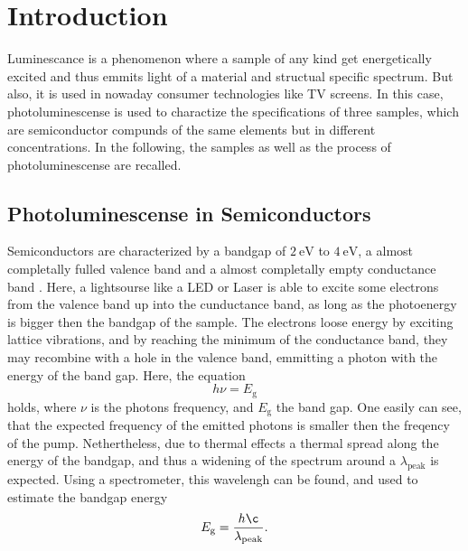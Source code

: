 \section{Introduction}
\label{sec:Introduction}

Luminescance is a phenomenon where a sample of any kind get energetically excited and thus emmits light of a material and structual specific spectrum.
But also, it is used in nowaday consumer technologies like TV screens. 
In this case, photoluminescense is used to charactize the specifications of three samples, which are semiconductor compunds of the same elements but in different concentrations.
In the following, the samples as well as the process of photoluminescense are recalled.

\subsection{Photoluminescense in Semiconductors}
\label{sec:PLS}

Semiconductors are characterized by a bandgap of $\SI{2}{\eV}$ to $\SI{4}{\eV}$, a almost completally fulled valence band and a almost completally empty conductance band \cite[391]{festkorperphysik}.
Here, a lightsourse like a LED or Laser is able to excite some electrons from the valence band up into the cunductance band, as long as the photoenergy is bigger then the bandgap of the sample.
The electrons loose energy by exciting lattice vibrations, and by reaching the minimum of the conductance band, they may recombine with a hole in the valence band, emmitting a photon with the energy of the band gap.
Here, the equation
\begin{equation}
    h\nu = E_{\text{g}}
\end{equation}
holds, where $\nu$ is the photons frequency, and $E_\text{g}$ the band gap.
One easily can see, that the expected frequency of the emitted photons is smaller then the freqency of the pump. 
Nethertheless, due to thermal effects a thermal spread along the energy of the bandgap, and thus a widening of the spectrum around a $\lambda_\text{peak}$ is expected.
Using a spectrometer, this wavelengh can be found, and used to estimate the bandgap energy
\begin{equation}
    E_{\text{g}} = \frac{h\c}{\lambda_\text{peak}}.
\end{equation}

